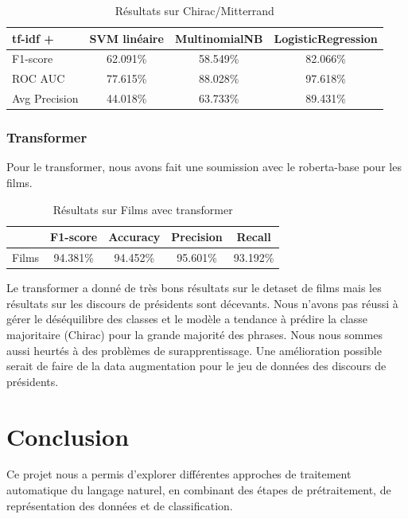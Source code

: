 \documentclass{article}
\begin{document}
\begin{table}[h]
\centering
\begin{tabular}{lccc}
\toprule
tf-idf + & SVM linéaire & MultinomialNB & LogisticRegression \\
\midrule
F1-score       & 62.091\% & 58.549\% & 82.066\% \\
ROC AUC        & 77.615\% & 88.028\% & 97.618\% \\
Avg Precision  & 44.018\% & 63.733\% & 89.431\% \\
\bottomrule
\end{tabular}
\caption{Résultats sur Chirac/Mitterrand}
\end{table}

\subsubsection{Transformer}

Pour le transformer, nous avons fait une soumission avec le roberta-base pour les films.\\

\begin{table}[h]
\centering
\begin{tabular}{lcccc}
\toprule
 & F1-score & Accuracy & Precision & Recall \\
\midrule
Films & 94.381\% & 94.452\% & 95.601\% & 93.192\% \\
\bottomrule
\end{tabular}
\caption{Résultats sur Films avec transformer}
\end{table}

Le transformer a donné de très bons résultats sur le detaset de films mais les résultats sur les discours de présidents sont décevants. Nous n'avons pas réussi à gérer le déséquilibre des classes et le modèle a tendance à prédire la classe majoritaire (Chirac) pour la grande majorité des phrases. Nous nous sommes aussi heurtés à des problèmes de surapprentissage. Une amélioration possible serait de faire de la data augmentation pour le jeu de données des discours de présidents.\\


\section{Conclusion}

Ce projet nous a permis d’explorer différentes approches de traitement automatique du langage naturel, en combinant des étapes de prétraitement, de représentation des données et de classification.
\end{document}
